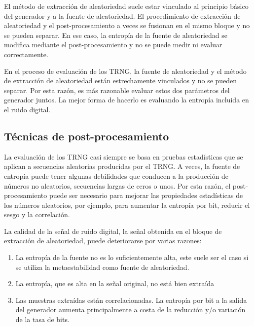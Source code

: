 					
	El método de extracción de aleatoriedad suele estar vinculado al principio básico del generador y a la fuente de aleatoriedad. El procedimiento de extracción de aleatoriedad y el post-procesamiento a veces se fusionan en el mismo bloque y no se pueden separar. En ese caso, la entropía de la fuente de aleatoriedad se modifica mediante el post-procesamiento y no se puede medir ni evaluar correctamente. 
					
	En el proceso de evaluación de los TRNG, la fuente de aleatoriedad y el método de extracción de aleatoriedad están estrechamente vinculados y no se pueden separar. Por esta razón, es más razonable evaluar estos dos parámetros del generador juntos. La mejor forma de hacerlo es evaluando la entropía incluida en el ruido digital.
		
	\subsection{Técnicas de post-procesamiento}
					
		La evaluación de los TRNG casi siempre se basa en pruebas estadísticas que se aplican a secuencias aleatorias producidas por el TRNG. A veces, la fuente de entropía puede tener algunas debilidades que conducen a la producción de números no aleatorios, secuencias largas de ceros o unos. Por esta razón, el post-procesamiento puede ser necesario para mejorar las propiedades estadísticas de los números aleatorios, por ejemplo, para aumentar la entropía por bit, reducir el sesgo y la correlación. 
					
	La calidad de la señal de ruido digital, la señal obtenida en el bloque de extracción de aleatoriedad, puede deteriorarse por varias razones: 
	
	\begin{enumerate}[noitemsep, label=(\alph*)]
		\item La entropía de la fuente no es lo suficientemente alta, este suele ser el caso si se utiliza la metaestabilidad como fuente de aleatoriedad.
		\item La entropía, que es alta en la señal original, no está bien extraída
		\item Las muestras extraídas están correlacionadas. La entropía por bit a la salida del generador aumenta principalmente a costa de la reducción y/o variación de la tasa de bits.
	\end{enumerate}		
	
